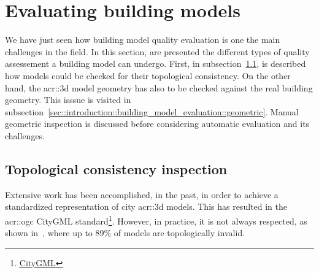 \section{Evaluating building models}
    \label{sec::introduction::building_model_evaluation}
    We have just seen how building model quality evaluation is one the main challenges in the field.
    In this section, are presented the different types of quality assessement a building model can undergo.
    First, in subsection~\ref{sec::introduction::building_model_evaluation::topological}, is described how models could be checked for their topological consistency.
    On the other hand, the \gls{acr::3d} model geometry has also to be checked against the real building geometry.
    This isssue is visited in subsection~\ref{sec::introduction::building_model_evaluation::geometric}.
    Manual geometric inspection is discussed before considering automatic evaluation and its challenges.

    \subsection{Topological consistency inspection}
        \label{sec::introduction::building_model_evaluation::topological}
        Extensive work has been accomplished, in the past, in order to achieve a standardized representation of city \gls{acr::3d} models.
        This has resulted in the \gls{acr::ogc} CityGML standard\footnote{\href{https://www.opengeospatial.org/standards/citygml}{CityGML}}.
        However, in practice, it is not always respected, as shown in~\textcite{biljecki2016most}, where up to 89\% of models are topologically invalid.\\

